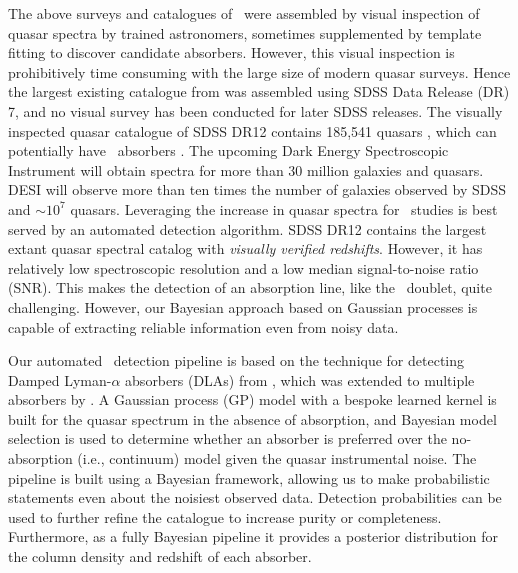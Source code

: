 \documentclass[fleqn,usenatbib]{mnras}
\newcommand{\civ}{\ion{C}{IV}}
\newcommand{\spb}[1]{\textcolor{red}{[\bf SPB: #1]}}
\begin{document}
The above surveys and catalogues of \civ\ were assembled by
visual inspection of quasar spectra by trained astronomers, sometimes
supplemented by template fitting to discover candidate absorbers.
However, this visual inspection is prohibitively time consuming %
with the large size
of modern quasar surveys. Hence the largest existing catalogue from
\cite{C13} was assembled using SDSS Data Release (DR) 7, and no
visual survey has been conducted for later SDSS releases.
The visually inspected quasar catalogue of SDSS DR12 contains 185,541 quasars \citep{sdssdr12ross},  which can potentially have \civ\ absorbers .
The upcoming  Dark Energy Spectroscopic Instrument \citep[DESI][]{desi}
  will obtain spectra for more than 30 million galaxies and quasars.
 DESI will observe more than ten times the number of galaxies observed by SDSS and %
 $\sim10^7$ quasars. %
Leveraging the increase in quasar spectra  for \civ\ studies is best served by an automated detection algorithm.
SDSS DR12 contains the largest extant quasar spectral catalog with \emph{visually verified redshifts}. However, it has relatively low spectroscopic resolution and a low median signal-to-noise ratio (SNR).
This makes the detection of an absorption line, like the \civ\ doublet, quite
challenging.
However, our Bayesian approach based on Gaussian processes is capable of extracting
reliable %
information even from noisy data.


Our automated \civ\ detection pipeline is based on the technique for detecting Damped Lyman-$\alpha$ absorbers (DLAs) %
from \cite{romanDLA}, which was extended to multiple absorbers by \cite{mfDLA}. A Gaussian process (GP) model with a bespoke learned kernel is built for the quasar spectrum in the absence of absorption, and Bayesian model selection is used to determine whether an absorber is preferred over the no-absorption (i.e., continuum) model given the quasar instrumental noise.
The pipeline is built using a Bayesian framework, allowing us to make probabilistic statements even about the noisiest observed data. Detection probabilities can be used to further refine the catalogue to increase purity or completeness.
Furthermore, as a fully Bayesian pipeline it provides a posterior distribution for the column density and redshift of each absorber.
\end{document}
